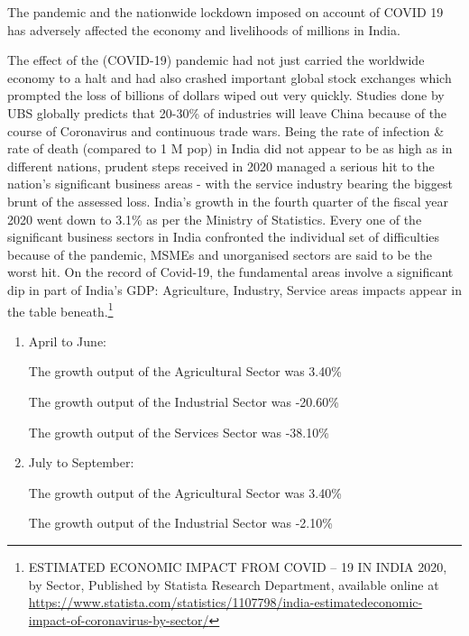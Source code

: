 \begin{multicols}{2}

\noi
The pandemic and the nationwide lockdown imposed on account of COVID 19 has adversely
affected the economy and livelihoods of millions in India.


\noi
The effect of the (COVID-19) pandemic had not just carried the worldwide economy to a halt
and had also crashed important global stock exchanges which prompted the loss of billions of
dollars wiped out very quickly. Studies done by UBS globally predicts that 20-30\% of
industries will leave China because of the course of Coronavirus and continuous trade wars.
Being the rate of infection \& rate of death (compared to 1 M pop) in India did not appear to
be as high as in different nations, prudent steps received in 2020 managed a serious hit to the
nation's significant business areas - with the service industry bearing the biggest brunt of the
assessed loss. India's growth in the fourth quarter of the fiscal year 2020 went down to 3.1\%
as per the Ministry of Statistics. Every one of the significant business sectors in India
confronted the individual set of difficulties because of the pandemic, MSMEs and
unorganised sectors are said to be the worst hit. On the record of Covid-19, the fundamental
areas involve a significant dip in part of India's GDP: Agriculture, Industry, Service areas
impacts appear in the table beneath.\footnote{ESTIMATED ECONOMIC IMPACT FROM COVID – 19 IN INDIA 2020, by Sector, Published by Statista Research Department, available online at  \url{https://www.statista.com/statistics/1107798/india-estimatedeconomic-impact-of-coronavirus-by-sector/}}

\begin{enumerate}[label=$\blacktriangleright$]
\itemsep=0pt

\item April to June:

The growth output of the Agricultural Sector was 3.40\%

The growth output of the Industrial Sector was -20.60\%

The growth output of the Services Sector was -38.10\%

\item July to September:

The growth output of the Agricultural Sector was 3.40\%

The growth output of the Industrial Sector was -2.10\%
 

\end{enumerate}
\end{multicols}

